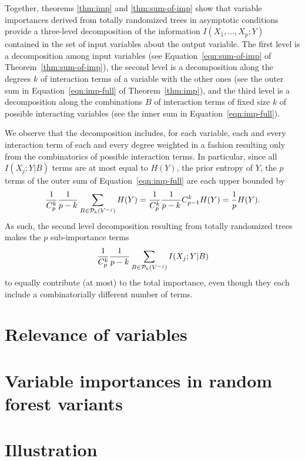 Together, theorems \ref{thm:imp} and \ref{thm:sum-of-imp} show that  variable
importances derived from totally randomized trees in asymptotic conditions
provide a three-level decomposition of the information $I(X_{1}, \ldots, X_{p}
; Y)$ contained in the set of input variables about the output variable. The
first level is a decomposition among input variables (see Equation~\ref{eqn:sum-of-imp}
of Theorem~\ref{thm:sum-of-imp}),  the second level is a
decomposition along the degrees $k$ of interaction terms of a variable with the
other ones (see the outer sum in Equation~\ref{eqn:imp-full} of
Theorem~\ref{thm:imp}), and the third level is a decomposition along the
combinations $B$ of interaction terms of fixed size $k$ of possible interacting
variables (see the inner sum in Equation~\ref{eqn:imp-full}).

We observe that the decomposition includes, for each variable, each and every
interaction term of each and every degree weighted in a fashion resulting only
from the combinatorics of possible interaction terms. In particular, since all
$I(X_j;Y|B)$ terms are at most equal to $H(Y)$, the prior entropy of $Y$,  the
$p$ terms of the outer sum of Equation~\ref{eqn:imp-full} are each upper
bounded by
\begin{equation}
\frac{1}{C^k_p}\frac{1}{p-k}\sum_{B \in {\cal P}_k(V^{-j})}
H(Y)=\frac{1}{C^k_p} \frac{1}{p-k} {C^k_{p-1}} H(Y) = \frac{1}{p}H(Y).
\end{equation}
As such,
the second level decomposition resulting from totally randomized trees makes the
$p$ sub-importance terms
\begin{equation}
\frac{1}{C^k_p} \frac{1}{p-k} \sum_{B \in {\cal P}_k(V^{-j})} I(X_j;Y|B)
\end{equation}
to equally contribute (at most) to the total
importance, even though they each include a combinatorially different number of
terms.


\section{Relevance of variables}
\label{sec:6:variable-relevance}


\section{Variable importances in random forest variants}
\label{sec:6:variants}


\section{Illustration}
\label{sec:6:illustration}

